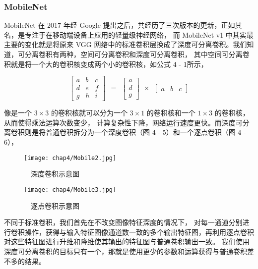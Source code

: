 \subsubsection{MobileNet}
MobileNet 在 2017 年经 Google 提出之后，共经历了三次版本的更新，正如其名，是专注于在移动端设备上应用的轻量级神经网络，
而 MobileNet v1 中其实最主要的变化就是将原来 VGG 网络中的标准卷积层换成了深度可分离卷积。我们知道，可分离卷积有两种，空间可分离卷积和深度可分离卷积，
其中空间可分离卷积就是将一个大的卷积核变成两个小的卷积核，如公式 4 - 1所示，

\begin{equation}
	{\left[ \begin{array}{ccc}
		a & b & c\\
		d & e & f\\
		g & h & i
	\end{array}
	\right ]}
	\ \ =\ \ 
	{\left[ \begin{array}{ccc}
		a \\
		d \\
		g 
	\end{array}
	\right ]}
	\ \ \times\ \ 
	{\left[ \begin{array}{ccc}
		a & b & c
	\end{array} 
	\right ]}
	\label{eq4-1}
\end{equation}
\vspace{3mm}

像是一个 $3\times 3$ 的卷积核就可以分为一个 $3\times 1$ 的卷积核和一个 $1\times 3$ 的卷积核，从而使得乘法运算次数变少，
计算复杂性下降，网络运行速度更快。而深度可分离卷积则是将普通卷积拆分为一个深度卷积（图 4 - 5）和一个逐点卷积（图 4 - 6），
\begin{figure}[htbp]
	\centering
	\begin{minipage}{0.48\linewidth}
		\centering
		\texttt{[image: chap4/Mobile2.jpg]}
		\caption{\ \ 深度卷积示意图}
		\label{fig4-5}%
	\end{minipage}
	\begin{minipage}{0.48\linewidth}
		\centering
		\texttt{[image: chap4/Mobile3.jpg]}
		\caption{\ \ 逐点卷积示意图}
		\label{fig4-6}%
	\end{minipage}
\end{figure}
不同于标准卷积，我们首先在不改变图像特征深度的情况下，
对每一通道分别进行卷积操作，获得与输入特征图像通道数一致的多个输出特征图，再利用逐点卷积对这些特征图进行升维和降维使其输出的特征图与普通卷积输出一致。
我们使用深度可分离卷积的目标只有一个，那就是使用更少的参数和运算获得与普通卷积差不多的结果。

